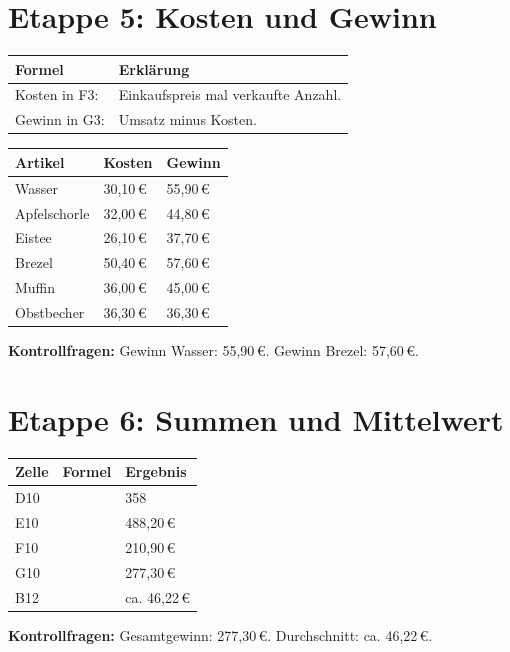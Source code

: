 \section*{Etappe 5: Kosten und Gewinn}
\begin{tabularx}{\textwidth}{|L{4.1cm}|Y|}
\hline
{}\textbf{Formel} & \textbf{Erklärung}\\\hline
Kosten in F3:  & Einkaufspreis mal verkaufte Anzahl.\\\hline
Gewinn in G3:  & Umsatz minus Kosten.\\\hline
\end{tabularx}

\begin{tabularx}{\textwidth}{|Y|L{2.7cm}|L{2.7cm}|}
\hline
{}\textbf{Artikel} & \textbf{Kosten} & \textbf{Gewinn}\\\hline
Wasser & 30,10\,\euro{} & 55,90\,\euro{}\\\hline
Apfelschorle & 32,00\,\euro{} & 44,80\,\euro{}\\\hline
Eistee & 26,10\,\euro{} & 37,70\,\euro{}\\\hline
Brezel & 50,40\,\euro{} & 57,60\,\euro{}\\\hline
Muffin & 36,00\,\euro{} & 45,00\,\euro{}\\\hline
Obstbecher & 36,30\,\euro{} & 36,30\,\euro{}\\\hline
\end{tabularx}
\textbf{Kontrollfragen:} Gewinn Wasser: 55,90\,\euro{}. Gewinn Brezel: 57,60\,\euro{}.

\section*{Etappe 6: Summen und Mittelwert}
\begin{tabularx}{\textwidth}{|L{3.5cm}|L{4.2cm}|Y|}
\hline
{}\textbf{Zelle} & \textbf{Formel} & \textbf{Ergebnis}\\\hline
D10 &  & 358\\\hline
E10 &  & 488,20\,\euro{}\\\hline
F10 &  & 210,90\,\euro{}\\\hline
G10 &  & 277,30\,\euro{}\\\hline
B12 &  & ca. 46,22\,\euro{}\\\hline
\end{tabularx}
\textbf{Kontrollfragen:} Gesamtgewinn: 277,30\,\euro{}. Durchschnitt: ca. 46,22\,\euro{}.

